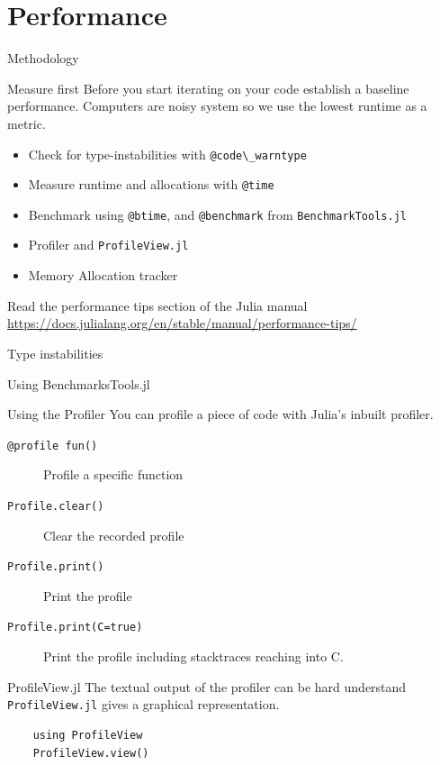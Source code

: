 \documentclass{beamer}
\begin{document}
\section{Performance}
\begin{frame}[fragile]{Methodology}
  \pause
  \begin{block}{Measure first}
    Before you start iterating on your code establish a baseline performance.
    Computers are noisy system so we use the lowest runtime as a metric.
  \end{block}
  \pause
  \begin{itemize}
    \item Check for type-instabilities with \lstinline{@code\_warntype}
    \item Measure runtime and allocations with \lstinline{@time}
    \item Benchmark using \lstinline{@btime}, and \lstinline{@benchmark} from \lstinline{BenchmarkTools.jl}
    \item Profiler and \lstinline{ProfileView.jl}
    \item Memory Allocation tracker
  \end{itemize}
  \pause
  Read the performance tips section of the Julia manual \url{https://docs.julialang.org/en/stable/manual/performance-tips/}
\end{frame}
\begin{frame}[fragile]{Type instabilities}
\end{frame}
\begin{frame}[fragile]{Using BenchmarksTools.jl}
\end{frame}
\begin{frame}[fragile]{Using the Profiler}
  You can profile a piece of code with Julia's inbuilt profiler.
  \begin{description}
    \item[\lstinline{@profile fun()}] Profile a specific function
    \item[\lstinline{Profile.clear()}] Clear the recorded profile
    \item[\lstinline{Profile.print()}] Print the profile
    \item[\lstinline{Profile.print(C=true)}] Print the profile including stacktraces reaching into C.
  \end{description}
  \begin{block}{ProfileView.jl}
    The textual output of the profiler can be hard understand \lstinline{ProfileView.jl} gives a graphical representation.
    \begin{lstlisting}
    using ProfileView
    ProfileView.view()
    \end{lstlisting}
  \end{block}
\end{frame}
\end{document}
